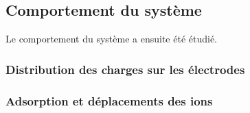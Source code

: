     \subsection{Comportement du système}

Le comportement du système a ensuite été étudié.

    \subsubsection{Distribution des charges sur les électrodes}



    \subsubsection{Adsorption et déplacements des ions}
